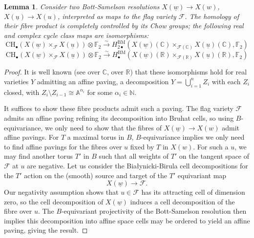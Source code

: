 \documentclass{amsart}
\newtheorem{lem}[thm]{Lemma}
\theoremstyle{definition}
\theoremstyle{remark}
\begin{document}
\begin{lem}\label{Lem:affine paving}
Consider two Bott-Samelson resolutions $X(\underline{w})\to X(w)$, $X(\underline{u})\to X(u)$, interpreted as maps to the flag variety $\mathscr{F}$. The homology of their fibre product is completely controlled by its Chow groups; the following real and complex cycle class maps are isomorphisms:
\[\mathrm{CH}_\bullet(X(\underline{w})\times_{\mathscr{F}}X(\underline{u}))\otimes \mathbb{F}_2 \xrightarrow{\sim} H_{2\bullet}^{\mathrm{BM}}(X(\underline{w})(\mathbb{C})\times_{\mathscr{F}(\mathbb{C})}X(\underline{u})(\mathbb{C}),\mathbb{F}_2)\]
\[\mathrm{CH}_\bullet(X(\underline{w})\times_{\mathscr{F}}X(\underline{u}))\otimes \mathbb{F}_2\xrightarrow{\sim} H_{\bullet}^{\mathrm{BM}}(X(\underline{w})(\mathbb{R})\times_{\mathscr{F}(\mathbb{R})}X(\underline{u})(\mathbb{R}),\mathbb{F}_2)\]
\end{lem}
\begin{proof}
It is well known (see \cite{fulton2012intersectiontheory} over $\mathbb{C}$, \cite{BorelHaefliger} over $\mathbb{R}$) that these isomorphisms hold for real varieties $Y$ admitting an affine paving, a decomposition $Y=\bigcup_{i=1}^n Z_i$ with each $Z_i$ closed, with $Z_i\setminus Z_{i-1}\cong \mathbb{A}^{\alpha_i}$ for some $\alpha_i\in \mathbb{N}$.

It suffices to show these fibre products admit such a paving. The flag variety $\mathscr{F}$ admits an affine paving refining its decomposition into Bruhat cells, so using $B$-equivariance, we only need to show that the fibres of $X(\underline{w})\to X(w)$ admit affine pavings. For $T$ a maximal torus in $B$, $B$-equivariance implies we only need to find affine pavings for the fibres over $u$ fixed by $T$ in $X(w)$. For such a $u$, we may find another torus $T'$ in $B$ such that all weights of $T'$ on the tangent space of $\mathscr{F}$ at $u$ are negative. Let us consider the Białynicki-Birula cell decompositions \cite{BBdecomposition} for the $T'$ action on the (smooth) source and target of the $T'$ equivariant map \[X(\underline{w})\to \mathscr{F}.\] Our negativity assumption shows that $u\in \mathscr{F}$ has its attracting cell of dimension zero, so the cell decomposition of $X(\underline{w})$ induces a cell decomposition of the fibre over $u$. The $B$-equivariant projectivity of the Bott-Samelson resolution then implies this decomposition into affine space cells may be ordered to yield an affine paving, giving the result.
\end{proof}
\end{document}
